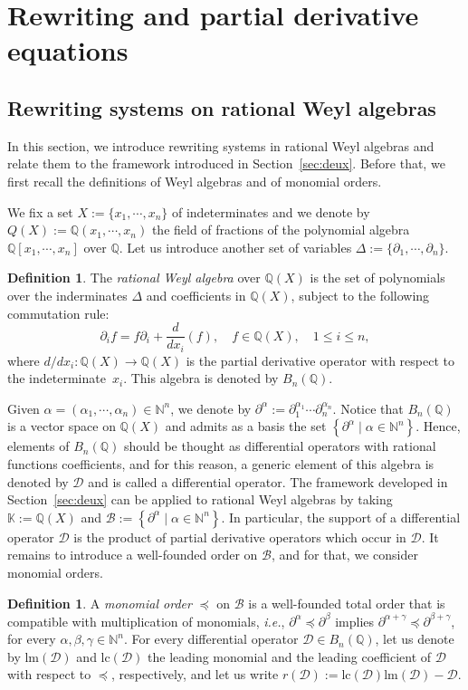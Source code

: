 \documentclass[10pt]{easychair}
\theoremstyle{definition}
\newtheorem{definition}[theorem]{Definition}
\newcommand\secTrois{Rewriting and partial derivative equations}
\newcommand\secTroisUn{Rewriting systems on rational Weyl algebras}
\newcommand\ie{\emph{i.e.}}
\newcommand\diff[1]{\partial_{#1}}
\newcommand\D{\mathcal{D}}
\newcommand\lm{\text{lm}}
\newcommand\lc{\text{lc}}
\newcommand\basis{\mathscr{B}}
\newcommand\K{\mathbb{K}}
\newcommand\Q{\mathbb{Q}}
\newcommand\N{\mathbb{N}}
\newcommand\QX{\mathbb{Q}[x_1,\cdots,x_n]}
\newcommand\QXX{\mathbb{Q}(x_1,\cdots,x_n)}
\newcommand\Weyl{B_n(\Q)}
\begin{document}
\section{\secTrois}\label{sec:trois}

\subsection{\secTroisUn}\label{sec:troisUn}

In this section, we introduce rewriting systems in rational Weyl algebras
and relate them to the framework introduced in Section~\ref{sec:deux}.
Before that, we first recall the definitions of Weyl algebras and of
monomial orders.
\medskip

We fix a set $X:=\{x_1,\cdots,x_n\}$ of indeterminates and we denote by
$Q(X):=\QXX$ the field of fractions of the polynomial algebra $\QX$ over
$\Q$. Let us introduce another set of variables
$\Delta:=\{\diff{1},\cdots,\diff{n}\}$. 

\begin{definition}
  The {\it rational Weyl algebra} over $\Q(X)$ is the set of polynomials
  over the inderminates $\Delta$ and coefficients in $\Q(X)$, subject to
  the following commutation rule:
  \[\diff{i}f=f\diff{i}+\frac{d}{dx_i}(f),\quad f\in\Q(X),\quad
  1\leq i\leq n,\]
  where $d/dx_i:\Q(X)\to\Q(X)$ is the partial derivative operator with
  respect to the indeterminate~$x_i$. This algebra is denoted by $\Weyl$.
\end{definition}

Given $\alpha=(\alpha_1,\cdots,\alpha_n)\in\N^n$, we denote by 
$\partial^{\alpha}:=\diff{1}^{\alpha_1}\cdots\diff{n}^{\alpha_n}$. Notice
that $\Weyl$ is a vector space on $\Q(X)$ and admits as a basis the set
$\left\{\partial^\alpha\mid\alpha\in\N^n\right\}$. Hence, elements of
$\Weyl$ should be thought as differential operators with rational
functions coefficients, and for this reason, a generic element of this
algebra is denoted by $\D$ and is called a differential operator. The
framework developed in Section~\ref{sec:deux} can be applied to rational
Weyl algebras by taking $\K:=\Q(X)$ and
$\basis:=\left\{\partial^\alpha\mid\alpha\in\N^n\right\}$. In particular,
the support of a differential operator $\D$ is the product of partial
derivative operators which occur in $\D$. It remains to introduce a
well-founded order on $\basis$, and for that, we consider monomial
orders.

\begin{definition}
  A {\em monomial order} $\preceq$ on $\basis$ is a well-founded total
  order that is compatible with multiplication of monomials, \ie,
  $\partial^{\alpha}\preceq\partial^{\beta}$ implies 
  $\partial^{\alpha+\gamma}\preceq\partial^{\beta+\gamma}$, for every
  $\alpha,\beta,\gamma\in\N^n$. For every differential operator
  $\D\in\Weyl$, let us denote by $\lm(\D)$ and $\lc(\D)$ the leading
  monomial and the leading coefficient of $\D$ with respect to $\preceq$,
  respectively, and let us write $r(\D):=\lc(\D)\lm(\D)-\D$. 
\end{definition}
\end{document}
